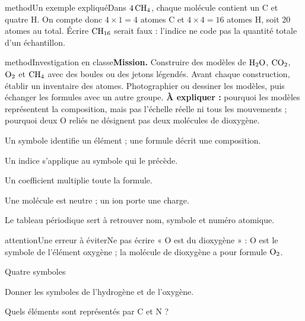 \begin{pcEncadre}{method}{Un exemple expliqué}Dans $4\,\ce{CH4}$, chaque molécule contient un C et quatre H. On compte donc $4\times1=4$ atomes C et $4\times4=16$ atomes H, soit 20 atomes au total. Écrire $\ce{CH16}$ serait faux : l’indice ne code pas la quantité totale d’un échantillon.\end{pcEncadre}
\label{activite-5}
\begin{pcEncadre}{method}{Investigation en classe}\textbf{Mission.} Construire des modèles de $\ce{H2O}$, $\ce{CO2}$, $\ce{O2}$ et $\ce{CH4}$ avec des boules ou des jetons légendés. Avant chaque construction, établir un inventaire des atomes. Photographier ou dessiner les modèles, puis échanger les formules avec un autre groupe. \textbf{À expliquer :} pourquoi les modèles représentent la composition, mais pas l’échelle réelle ni tous les mouvements ; pourquoi deux O reliés ne désignent pas deux molécules de dioxygène.\end{pcEncadre}
\begin{questions}
\item Un symbole identifie un élément ; une formule décrit une composition.
\item Un indice s’applique au symbole qui le précède.
\item Un coefficient multiplie toute la formule.
\item Une molécule est neutre ; un ion porte une charge.
\item Le tableau périodique sert à retrouver nom, symbole et numéro atomique.
\end{questions}
\begin{pcEncadre}{attention}{Une erreur à éviter}Ne pas écrire « O est du dioxygène » : O est le symbole de l’élément oxygène ; la molécule de dioxygène a pour formule $\ce{O2}$.\end{pcEncadre}
\pcGrille
\clearpage{}
\par\noindent\begin{minipage}{\linewidth}
\begin{exercice}[1]{Quatre symboles}
\begin{questions}
\item Donner les symboles de l’hydrogène et de l’oxygène.
\item Quels éléments sont représentés par C et N ?
\end{questions}
\end{exercice}
\end{minipage}
